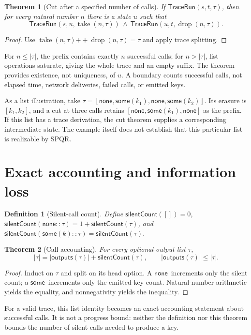 \documentclass[11pt]{article}
\newtheorem{definition}{Definition}
\newtheorem{theorem}{Theorem}
\newcommand{\Trace}{\ensuremath{\mathsf{TraceRun}}}
\newcommand{\erase}{\ensuremath{\mathsf{outputs}}}
\newcommand{\silent}{\ensuremath{\mathsf{silentCount}}}
\newcommand{\None}{\ensuremath{\mathsf{none}}}
\newcommand{\Some}{\ensuremath{\mathsf{some}}}
\newcommand{\cat}{\mathbin{+\!+}}
\begin{document}
\begin{theorem}[Cut after a specified number of calls]
If $\Trace(s,t,\tau)$, then for every natural number $n$ there is a state $u$ such that
\[
\Trace(s,u,\operatorname{take}(n,\tau))\ \land\
\Trace(u,t,\operatorname{drop}(n,\tau)).
\]
\end{theorem}
\begin{proof}
Use $\operatorname{take}(n,\tau)\cat\operatorname{drop}(n,\tau)=\tau$
and apply trace splitting.
\end{proof}

For $n\leq |\tau|$, the prefix contains exactly $n$ successful calls; for $n>|\tau|$,
list operations saturate, giving the whole trace and an empty suffix. The theorem provides
existence, not uniqueness, of $u$. A boundary counts successful calls, not elapsed time,
network deliveries, failed calls, or emitted keys.

As a list illustration, take
$\tau=[\None,\Some(k_1),\None,\Some(k_2)]$.
Its erasure is $[k_1,k_2]$, and a cut at three calls retains
$[\None,\Some(k_1),\None]$ as the prefix. If this list has a trace derivation, the cut
theorem supplies a corresponding intermediate state. The example itself does not establish
that this particular list is realizable by SPQR.

\section{Exact accounting and information loss}
\begin{definition}[Silent-call count]
Define $\silent([])=0$, $\silent(\None::\tau)=1+\silent(\tau)$, and
$\silent(\Some(k)::\tau)=\silent(\tau)$.
\end{definition}
\begin{theorem}[Call accounting]
For every optional-output list $\tau$,
\[
|\tau|=|\erase(\tau)|+\silent(\tau),\qquad |\erase(\tau)|\leq|\tau|.
\]
\end{theorem}
\begin{proof}
Induct on $\tau$ and split on its head option. A \None\ increments only the silent count;
a \Some\ increments only the emitted-key count. Natural-number arithmetic yields the
equality, and nonnegativity yields the inequality.
\end{proof}
For a valid trace, this list identity becomes an exact accounting statement about successful
calls. It is not a progress bound: neither the definition nor this theorem bounds the number
of silent calls needed to produce a key.
\end{document}
